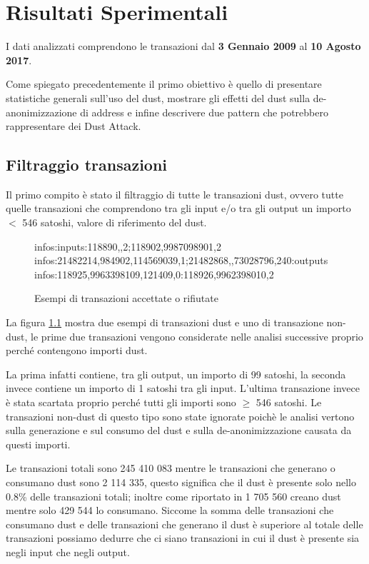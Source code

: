 \chapter{Risultati Sperimentali}
\captionsetup[table]{name=Tabella}
I dati analizzati comprendono le transazioni dal \textbf{3 Gennaio 2009} al \textbf{10 Agosto 2017}.

Come spiegato precedentemente il primo obiettivo è quello di presentare statistiche generali sull'uso del dust, mostrare gli effetti del dust sulla de-anonimizzazione di address e infine descrivere due pattern che potrebbero rappresentare dei Dust Attack.
\section{Filtraggio transazioni}
Il primo compito è stato il filtraggio di tutte le transazioni dust, ovvero tutte quelle transazioni che comprendono tra gli input e/o tra gli output un importo $<$ 546 satoshi, valore di riferimento del dust.
\begin{figure}[H]
\begin{mdframed}
 infos:inputs:118890,,2;118902,9987098901,2 \checkmark\\
 infos:21482214,984902,114569039,1;21482868,,73028796,240:outputs \checkmark\\
 infos:118925,9963398109,121409,0:118926,9962398010,2 
\end{mdframed}
\caption{Esempi di transazioni accettate o rifiutate}
\label{tx_dust}
\end{figure}
\Floatbarrier
La figura \ref{tx_dust} mostra due esempi di transazioni dust e uno di transazione non-dust, le prime due transazioni vengono considerate nelle analisi successive proprio perché contengono importi dust. 

La prima infatti contiene, tra gli output, un importo di 99 satoshi, la seconda invece contiene un importo di 1 satoshi tra gli input. L'ultima transazione invece è stata scartata proprio perché tutti gli importi sono $\ge$ 546 satoshi. Le transazioni non-dust di questo tipo sono state ignorate poichè le analisi vertono sulla generazione e sul consumo del dust e sulla de-anonimizzazione causata da questi importi.

Le transazioni totali sono 245 410 083 mentre le transazioni che generano o consumano dust sono  2 114 335, questo significa che il dust è presente solo nello 0.8\% delle transazioni totali; inoltre come riportato in \cite{dustAnalisi} 1 705 560 creano dust mentre solo 429 544 lo consumano. Siccome la somma delle transazioni che consumano dust e delle transazioni che generano il dust è superiore al totale delle transazioni possiamo dedurre che ci siano transazioni in cui il dust è presente sia negli input che negli output.

